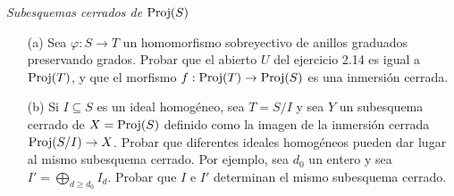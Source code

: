 \documentclass[twoside]{article}
\begin{document}
%
\begin{ejercicio}{3.12}\emph{Subesquemas cerrados de $\operatorname{Proj}(S)$}
\begin{enumerate}
\item[(a)]Sea $\varphi:S\to T$ un homomorfismo sobreyectivo de anillos graduados preservando grados. Probar que el abierto $U$ del ejercicio 2.14 es igual a $\operatorname{Proj}(T)$, y que el morfismo $f:\operatorname{Proj}(T)\to\operatorname{Proj}(S)$ es una inmersión cerrada.
\item[(b)] Si $I\subseteq S$ es un ideal homogéneo, sea $T=S/I$ y sea $Y$ un subesquema cerrado de $X=\operatorname{Proj}(S)$ definido como la imagen de la inmersión cerrada $\operatorname{Proj}(S/I)\to X$. Probar que diferentes ideales homogéneos pueden dar lugar al mismo subesquema cerrado. Por ejemplo, sea $d_0$ un entero y sea $I'=\bigoplus_{d\geq d_0}I_d$. Probar que $I$ e $I'$ determinan el mismo subesquema cerrado.
\end{enumerate}
\end{ejercicio}
\end{document}
